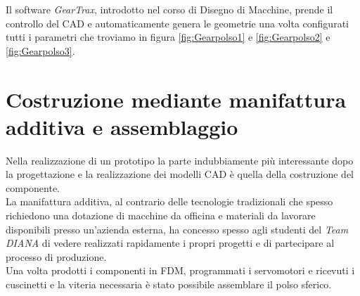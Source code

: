 \documentclass[%
corpo=11pt,
twoside,
 stile=classica,
oldstyle,
greek,%
]{toptesi}
\begin{document}
		Il software \textit{GearTrax}, introdotto nel corso di Disegno di Macchine, prende il controllo del CAD e automaticamente genera le geometrie una volta configurati tutti i parametri che troviamo in figura \ref{fig:Gearpolso1} e \ref{fig:Gearpolso2} e \ref{fig:Gearpolso3}.
			
		
	

	

\chapter{Costruzione mediante manifattura additiva e assemblaggio}
Nella realizzazione di un prototipo la parte indubbiamente più interessante dopo la progettazione e la realizzazione dei modelli CAD è quella della costruzione del componente.\\
 La manifattura additiva, al contrario delle tecnologie tradizionali che spesso richiedono una dotazione di macchine da officina e materiali da lavorare disponibili presso un'azienda esterna, ha concesso spesso agli studenti del \textit{Team DIANA} di vedere realizzati rapidamente i propri progetti e di partecipare al processo di produzione.\\
  Una volta prodotti i componenti in FDM, programmati i servomotori e ricevuti i cuscinetti e la viteria necessaria è stato possibile assemblare il polso sferico. 
\end{document}

